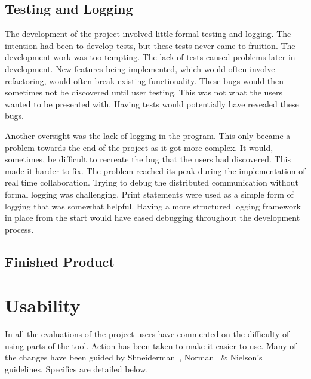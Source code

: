
\subsection{Testing and Logging}

The development of the project involved little formal testing and logging.  The intention had been to develop tests, but these tests never came to fruition.  The development work was too tempting. The lack of tests caused problems later in development.  New features being implemented, which would often involve refactoring, would often break existing functionality.  These bugs would then sometimes not be discovered until user testing.  This was not what the users wanted to be presented with.  Having tests would potentially have revealed these bugs.

Another oversight was the lack of logging in the program.  This only became a problem towards the end of the project as it got more complex.  It would, sometimes, be difficult to recreate the bug that the users had discovered.  This made it harder to fix.  The problem reached its peak during the implementation of real time collaboration.  Trying to debug the distributed communication without formal logging was challenging.  Print statements were used as a simple form of logging that was somewhat helpful.  Having a more structured logging framework in place from the start would have eased debugging throughout the development process.

\subsection{Finished Product}



\section{Usability}

In all the evaluations of the project users have commented on the difficulty of using parts of the tool.  Action has been taken to make it easier to use.  Many of the changes have been guided by Shneiderman~\cite{shgold}, Norman~\cite{normsev} \& Nielson's~\cite{neilten} guidelines.  Specifics are detailed below.

